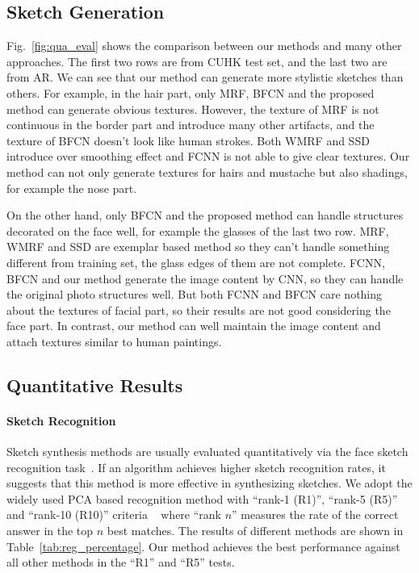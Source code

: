 \documentclass[10pt,twocolumn,letterpaper]{article}
\begin{document}
\subsection{Sketch Generation}

Fig.~\ref{fig:qua_eval} shows the comparison between our methods and many other approaches. The first two rows are from CUHK test set, and the last two are from AR. We can see that our method can generate more stylistic sketches than others. For example, in the hair part, only MRF, BFCN and the proposed method can generate obvious textures. However, the texture of MRF is not continuous in the border part and introduce many other artifacts, and the texture of BFCN doesn't look like human strokes. Both WMRF and SSD introduce over smoothing effect and FCNN is not able to give clear textures. Our method can not only generate textures for hairs and mustache but also shadings, for example the nose part.

On the other hand, only BFCN and the proposed method can handle structures decorated on the face well, for example the glasses of the last two row. MRF, WMRF and SSD are exemplar based method so they can't handle something different from training set, the glass edges of them are not complete. FCNN, BFCN and our method generate the image content by CNN, so they can handle the original photo structures well. But both FCNN and BFCN care nothing about the textures of facial part, so their results are not good considering the face part. In contrast, our method can well maintain the image content and attach textures similar to human paintings. 

\subsection{Quantitative Results}

\paragraph*{Sketch Recognition} Sketch synthesis methods are usually evaluated quantitatively  via the face sketch recognition task~\cite{song2014real,wang2009face,zhang2015end,zhou2012markov}. If an algorithm achieves higher sketch recognition rates, it suggests that this method is more effective in synthesizing sketches. We adopt the widely used PCA based recognition method with ``rank-1 (R1)'', ``rank-5 (R5)'' and ``rank-10 (R10)'' criteria ~\cite{wang2009face} where ``rank $n$'' measures the rate of the correct answer in the top $n$ best matches. The results of different methods are shown in Table~\ref{tab:reg_percentage}. Our method achieves the best performance against all other methods in the ``R1'' and ``R5'' tests. 
\end{document}
